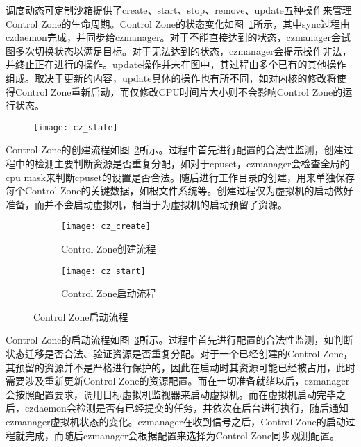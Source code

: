 调度动态可定制沙箱提供了create、start、stop、remove、update五种操作来管理Control Zone的生命周期。Control Zone的状态变化如图~\ref{fig:cz_state}所示，其中sync过程由czdaemon完成，并同步给czmanager。对于不能直接达到的状态，czmanager会试图多次切换状态以满足目标。对于无法达到的状态，czmanager会提示操作非法，并终止正在进行的操作。update操作并未在图中，其过程由多个已有的其他操作组成。取决于更新的内容，update具体的操作也有所不同，如对内核的修改将使得Control Zone重新启动，而仅修改CPU时间片大小则不会影响Control Zone的运行状态。

\begin{figure}[!htbp]
    \centering
    \texttt{[image: cz\_state]}
    \label{fig:cz_state}
\end{figure}

Control Zone的创建流程如图~\ref{fig:cz_create}所示。过程中首先进行配置的合法性监测，创建过程中的检测主要判断资源是否重复分配，如对于cpuset，czmanager会检查全局的cpu mask来判断cpuset的设置是否合法。随后进行工作目录的创建，用来单独保存每个Control Zone的关键数据，如根文件系统等。创建过程仅为虚拟机的启动做好准备，而并不会启动虚拟机，相当于为虚拟机的启动预留了资源。

\begin{figure}[H]
    \centering
    \begin{subfigure}[b]{0.42\textwidth}
        \texttt{[image: cz\_create]}
        \caption{\quad Control Zone创建流程}
        \label{fig:cz_create}
    \end{subfigure}
    \hfill
    \begin{subfigure}[b]{0.56\textwidth}
        \texttt{[image: cz\_start]}
        \caption{\quad Control Zone启动流程}
        \label{fig:cz_start}
    \end{subfigure}
\label{fig:cz_create_start}
\end{figure}

Control Zone的启动流程如图~\ref{fig:cz_start}所示。过程中首先进行配置的合法性监测，如判断状态迁移是否合法、验证资源是否重复分配。对于一个已经创建的Control Zone，其预留的资源并不是严格进行保护的，因此在启动时其资源可能已经被占用，此时需要涉及重新更新Control Zone的资源配置。而在一切准备就绪以后，czmanager会按照配置要求，调用目标虚拟机监视器来启动虚拟机。而在虚拟机启动完毕之后，czdaemon会检测是否有已经提交的任务，并依次在后台进行执行，随后通知czmanager虚拟机状态的变化。czmanager在收到信号之后，Control Zone的启动过程就完成，而随后czmanager会根据配置来选择为Control Zone同步观测配置。

